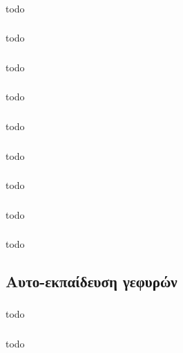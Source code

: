 \documentclass[a4paper, 12pt]{article}
\begin{document}
		\subsubsection{}
			todo

		\subsubsection{}
			todo

		\subsubsection{}
			todo

		\subsubsection{}
			todo

		\subsubsection{}
			todo

		\subsubsection{}
			todo

		\subsubsection{}
			todo

		\subsubsection{}
			todo

		\subsubsection{}
			todo

	\subsection{Αυτο-εκπαίδευση γεφυρών}

		\subsubsection{}
			todo

		\subsubsection{}
			todo
\end{document}
